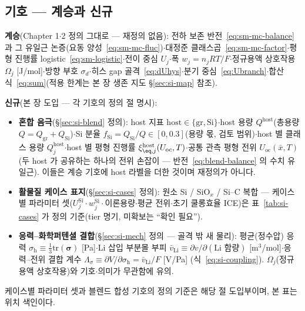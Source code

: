 \subsection*{기호 --- 계승과 신규}
\textbf{계승}(Chapter 1$\cdot$2 정의 그대로 --- 재정의 없음): 전하 보존 반전~\eqref{eq:sm-mc-balance}
과 그 유일근 논증(요동 양성~\eqref{eq:sm-mc-fluc})$\cdot$대정준 클래스곱~\eqref{eq:sm-mc-factor}$\cdot$평형
진행률 logistic~\eqref{eq:sm-logistic}$\cdot$전이 중심 $U_j$$\cdot$폭 $w_j{=}n_jRT/F$$\cdot$정규용액
상호작용 $\Omega_j$ [J/mol]$\cdot$방향 부호 $\sigma_d$$\cdot$히스 gap 골격~\eqref{eq:dUhys}$\cdot$분기
중심~\eqref{eq:Ubranch}$\cdot$합산식~\eqref{eq:sum}(적용 한계는 본 장 생존 지도 \S\ref{sec:si-map} 참조).

\textbf{신규}(본 장 도입 --- 각 기호의 정의 절 명시):
\begin{itemize}[leftmargin=1.4em,itemsep=1pt]
\item \textbf{혼합 음극}(\S\ref{sec:si-blend} 정의): host 지표 $\mathrm{host}\in\{\mathrm{gr},
\mathrm{Si}\}$$\cdot$host 용량 $Q^\mathrm{host}$(총용량 $Q{=}Q_\mathrm{gr}{+}Q_\mathrm{Si}$)$\cdot$Si 분율
$f_\mathrm{Si}{=}Q_\mathrm{Si}/Q\in[0,0.3]$(용량 몫, 검토 범위)$\cdot$host 별 클래스 용량
$Q_j^\mathrm{host}$$\cdot$host 별 평형 진행률 $\xi_{\eq,j}^\mathrm{host}(U_\mathrm{oc},T)$$\cdot$공통 관측
평형 전위 $U_\mathrm{oc}(\bar x,T)$(두 host 가 공유하는 하나의 전위 손잡이 --- 반전~\eqref{eq:blend-balance}
의 수치 유일근). 이들은 계승 기호에 host 라벨을 더한 것이며 재정의가 아니다.
\item \textbf{활물질 케이스 표지}(\S\ref{sec:si-cases} 정의): 원소 Si / SiO$_x$ / Si--C 복합 ---
케이스별 파라미터 셋($U_j^\mathrm{Si}\cdot w_j^\mathrm{Si}\cdot$이론용량$\cdot$평균 전위$\cdot$초기
쿨롱효율 ICE)은 표~\ref{tab:si-cases} 가 정의 기준(tier 명기, 미확보는 ``확인 필요'').
\item \textbf{응력--화학퍼텐셜 결합}(\S\ref{sec:si-mech} 정의 --- 골격 밖 새 물리): 평균(정수압) 응력
$\sigma_\mathrm{h}{\equiv}\tfrac13\mathrm{tr}(\bm\sigma)$ [Pa]$\cdot$Li 삽입 부분몰 부피
$\bar v_\mathrm{Li}{\equiv}\partial v/\partial(\text{Li 함량})$ [m$^3$/mol]$\cdot$응력--전위 결합 계수
$\Lambda_\sigma{\equiv}\partial V/\partial\sigma_\mathrm{h}{=}\bar v_\mathrm{Li}/F$ [V/Pa]
(식~\eqref{eq:si-coupling}). $\Omega_j$(정규용액 상호작용)와 기호$\cdot$의미가 무관함에 유의.
\end{itemize}
케이스별 파라미터 셋과 블렌드 합성 기호의 정의 기준은 해당 절 도입부이며, 본 표는 위치 색인이다.

